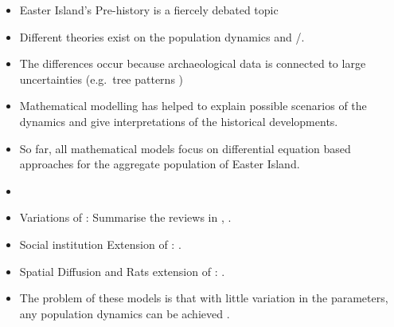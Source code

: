 \begin{itemize}
	\item Easter Island's Pre-history is a fiercely debated topic
	\item Different theories exist on the population dynamics \citet{Hunt2007} and \citet{Diamond2011}/\citet{Bahn2017}.
	\item The differences occur because archaeological data is connected to large uncertainties (e.g.\ tree patterns \citet{Rull2020})
	\item Mathematical modelling has helped to explain possible scenarios of the dynamics and give interpretations of the historical developments.
	\item So far, all mathematical models focus on differential equation based approaches for the aggregate population of Easter Island.
	\item \citet{Brander1998}
	\item Variations of \citet{Brander1998}: Summarise the reviews in \citet{Reuveny2012}, \citet{Merico2017}.
	\item Social institution Extension of \citet{Brander1998}: \citet{Good2006}.
	\item Spatial Diffusion and Rats extension of \citet{Brander1998}: \citet{Basener2008}.
	\item The problem of these models is that with little variation in the parameters, any population dynamics can be achieved \citep{Brandt2015}.
\end{itemize}

